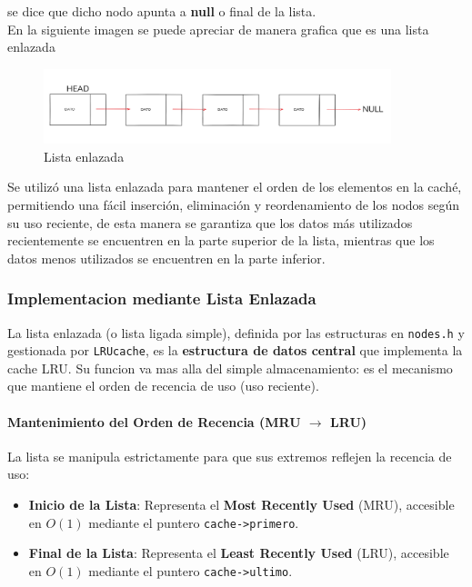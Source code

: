     se dice que dicho nodo apunta a \textbf{null} o final de la lista.\\
    En la siguiente imagen se puede apreciar de manera grafica que es una lista enlazada
    \begin{figure}[H]
        \centering %
        \includegraphics[width=0.9\textwidth]{./src/images/ListaEnlazada.png} 
        \caption{Lista enlazada} 
        \label{fig: lista} 
    \end{figure}
    Se utilizó una lista enlazada para mantener el orden de los elementos en la caché, permitiendo una fácil inserción, eliminación y reordenamiento de los nodos 
    según su uso reciente, de esta manera se garantiza que los datos más utilizados recientemente se encuentren en la parte superior de la lista, mientras que los 
    datos menos utilizados se encuentren en la parte inferior.
    \subsubsection{Implementacion mediante Lista Enlazada}
    La lista enlazada (o lista ligada simple), definida por las estructuras en \texttt{nodes.h} y gestionada por \texttt{LRUcache}, 
    es la \textbf{estructura de datos central} que implementa la cache LRU. Su funcion va mas alla del simple almacenamiento: es el mecanismo que mantiene el 
    orden de recencia de uso (uso reciente).
    \paragraph{Mantenimiento del Orden de Recencia (MRU $\rightarrow$ LRU)}
    La lista se manipula estrictamente para que sus extremos reflejen la recencia de uso:
    \begin{itemize}
        \item \textbf{Inicio de la Lista}: Representa el \textbf{Most Recently Used} (MRU), accesible en $O(1)$ mediante el puntero \texttt{cache->primero}.
        \item \textbf{Final de la Lista}: Representa el \textbf{Least Recently Used} (LRU), accesible en $O(1)$ mediante el puntero \texttt{cache->ultimo}.
    \end{itemize}

